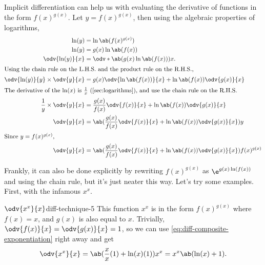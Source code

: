 Implicit differentiation can help us with evaluating the derivative of functions in the form $f(x)^{g(x)}$. Let $y = f(x)^{g(x)}$, then using the algebraic properties of logarithms,
\begin{align}
	\ln(y)                            & = \ln\ab(f(x)^{g(x)})                                                                                                 \\
	\ln(y)                            & = g(x)\ln\ab(f(x))                                                                                                    \\
	\odv{\ln(y)}{x}                   & = \odv*{\ab(g(x)\ln\ab(f(x)))}{x}.                                                                                    \\
	\intertext{Using the chain rule on the L.H.S. and the product rule on the R.H.S.,}
	\odv{\ln(y)}{y} \times \odv{y}{x} & = g(x)\odv{\ln\ab(f(x))}{x} + \ln\ab(f(x))\odv{g(x)}{x}                                                               \\
	\intertext{The derivative of the $\ln(x)$ is $\frac{1}{x}$ (\cref{sec:logarithms}), and use the chain rule on the R.H.S.}
	\frac{1}{y} \times \odv{y}{x}     & = \frac{g(x)}{f(x)}\odv{f(x)}{x} + \ln\ab(f(x))\odv{g(x)}{x}                                                          \\
	\odv{y}{x}                        & = \ab(\frac{g(x)}{f(x)}\odv{f(x)}{x} + \ln\ab(f(x))\odv{g(x)}{x})y                                                    \\
	\intertext{Since $y = f(x)^{g(x)}$,}
	\odv{y}{x}                        & = \ab(\frac{g(x)}{f(x)}\odv{f(x)}{x} + \ln\ab(f(x))\odv{g(x)}{x})f(x)^{g(x)} \label{eq:diff-composite-exponentiation}
\end{align}

Frankly, it can also be done explicitly by rewriting $f(x)^{g(x)}$ as $\e^{g(x)\ln(f(x))}$ and using the chain rule, but it's just neater this way. Let's try some examples. First, with the infamous $x^x$.
\begin{exmp}{$\odv{x^x}{x}$}{diff-technique-5}
	This function $x^x$ is in the form $f(x)^{g(x)}$ where $f(x) = x$, and $g(x)$ is also equal to $x$. Trivially, $\odv{f(x)}{x} = \odv{g(x)}{x} = 1$, so we can use \cref{eq:diff-composite-exponentiation} right away and get
	\begin{equation}
		\odv{x^x}{x} = \ab(\frac{x}{x}(1) + \ln(x)(1))x^x = x^x\ab(\ln(x) + 1).
	\end{equation}
\end{exmp}

